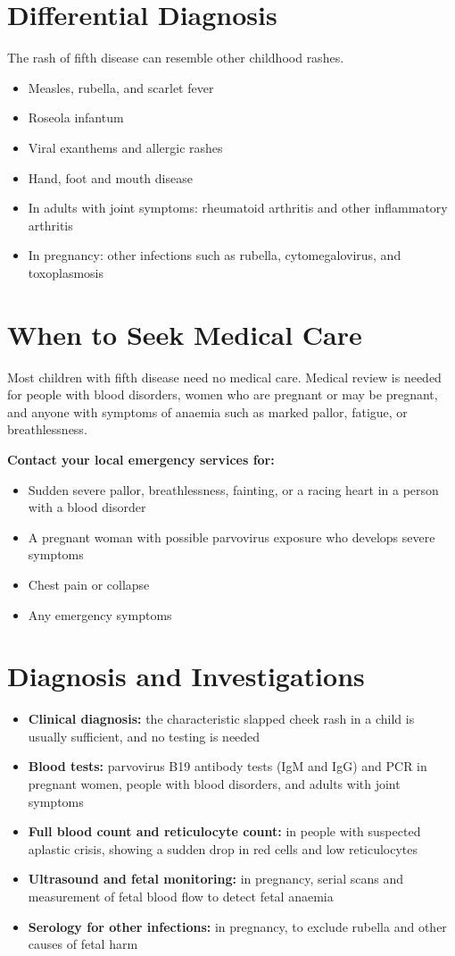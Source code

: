 \section*{Differential Diagnosis}
The rash of fifth disease can resemble other childhood rashes.
\begin{itemize}
    \item Measles, rubella, and scarlet fever
    \item Roseola infantum
    \item Viral exanthems and allergic rashes
    \item Hand, foot and mouth disease
    \item In adults with joint symptoms: rheumatoid arthritis and other inflammatory arthritis
    \item In pregnancy: other infections such as rubella, cytomegalovirus, and toxoplasmosis
\end{itemize}

\section*{When to Seek Medical Care}
Most children with fifth disease need no medical care. Medical review is needed for people with blood disorders, women who are pregnant or may be pregnant, and anyone with symptoms of anaemia such as marked pallor, fatigue, or breathlessness.

\textbf{Contact your local emergency services for:}
\begin{itemize}
    \item Sudden severe pallor, breathlessness, fainting, or a racing heart in a person with a blood disorder
    \item A pregnant woman with possible parvovirus exposure who develops severe symptoms
    \item Chest pain or collapse
    \item Any emergency symptoms
\end{itemize}

\section*{Diagnosis and Investigations}
\begin{itemize}
    \item \textbf{Clinical diagnosis:} the characteristic slapped cheek rash in a child is usually sufficient, and no testing is needed
    \item \textbf{Blood tests:} parvovirus B19 antibody tests (IgM and IgG) and PCR in pregnant women, people with blood disorders, and adults with joint symptoms
    \item \textbf{Full blood count and reticulocyte count:} in people with suspected aplastic crisis, showing a sudden drop in red cells and low reticulocytes
    \item \textbf{Ultrasound and fetal monitoring:} in pregnancy, serial scans and measurement of fetal blood flow to detect fetal anaemia
    \item \textbf{Serology for other infections:} in pregnancy, to exclude rubella and other causes of fetal harm
\end{itemize}

